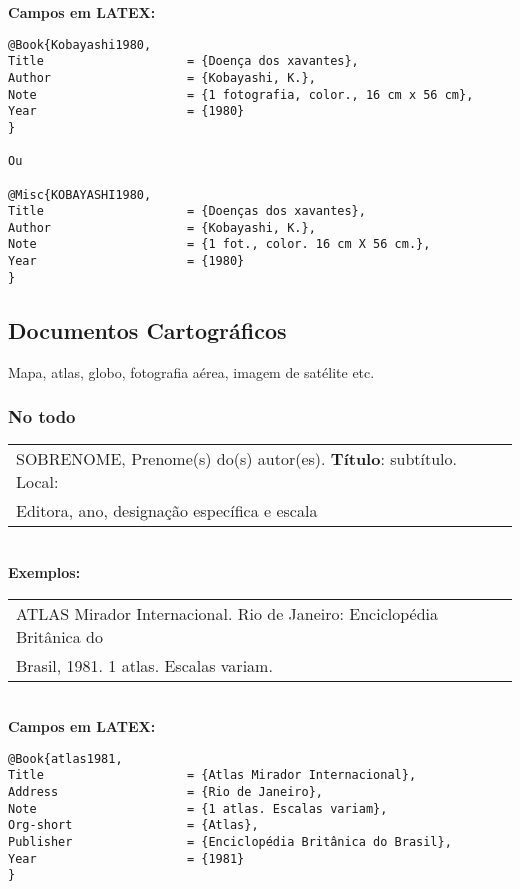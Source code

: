 \textbf{Campos em LATEX:} 
	
\begingroup
\fontsize{10pt}{12pt}\selectfont
\begin{verbatim}
@Book{Kobayashi1980,
Title                    = {Doença dos xavantes},
Author                   = {Kobayashi, K.},
Note                     = {1 fotografia, color., 16 cm x 56 cm},
Year                     = {1980}
}

Ou

@Misc{KOBAYASHI1980,
Title                    = {Doenças dos xavantes},
Author                   = {Kobayashi, K.},
Note                     = {1 fot., color. 16 cm X 56 cm.},
Year                     = {1980}
}
\end{verbatim}
\endgroup
\subsection{Documentos Cartográficos}
	
Mapa, atlas, globo, fotografia aérea, imagem de satélite etc. 
\subsubsection{No todo}
	
\begin{tabular}{|l|c|} \hline
	SOBRENOME, Prenome(s) do(s) autor(es). \textbf{Título}: subtítulo. Local: \\
	Editora, ano, designação específica e escala                             
	                                                                            \\\hline
\end{tabular} \\
	
\textbf{Exemplos:} \\
	
\begin{tabular}{|l|c|} \hline
	ATLAS Mirador Internacional. Rio de Janeiro: Enciclopédia Britânica do \\
	Brasil, 1981. 1 atlas. Escalas variam.                                   
	                                                                         \\\hline
\end{tabular} \\
	
\textbf{Campos em LATEX:} 
	
\begingroup
\fontsize{10pt}{12pt}\selectfont
\begin{verbatim}
@Book{atlas1981,
Title                    = {Atlas Mirador Internacional},
Address                  = {Rio de Janeiro},
Note                     = {1 atlas. Escalas variam},
Org-short                = {Atlas},
Publisher                = {Enciclopédia Britânica do Brasil},
Year                     = {1981}
}
\end{verbatim}
\endgroup
	
